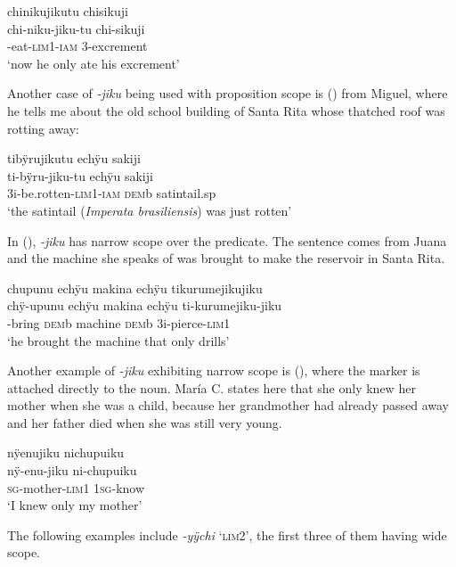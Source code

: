\ea\label{ex:jiku-1}
\begingl
\glpreamble chinikujikutu chisikuji\\
\gla chi-niku-jiku-tu chi-sikuji\\
-eat-\textsc{lim}1-\textsc{iam} 3-excrement\\
\glft ‘now he only ate his excrement’
\endgl
\trailingcitation{[jmx-n120429ls-x5.213]}
\xe

Another case of \textit{-jiku} being used with proposition scope is () from Miguel, where he tells me about the old school building of Santa Rita whose thatched roof was rotting away:

\ea\label{ex:jiku-4}
\begingl
\glpreamble tibÿrujikutu echÿu sakiji\\
\gla ti-bÿru-jiku-tu echÿu sakiji\\
\glb 3i-be.rotten-\textsc{lim}1-\textsc{iam} \textsc{dem}b satintail.sp\\
\glft ‘the satintail (\textit{Imperata brasiliensis}) was just rotten’
\endgl
\trailingcitation{[mxx-p110825l.090]}
\xe

In (), \textit{-jiku} has narrow scope over the predicate. The sentence comes from Juana and the machine she speaks of was brought to make the reservoir in Santa Rita.

\ea\label{ex:jiku-3}
\begingl
\glpreamble chupunu echÿu makina echÿu tikurumejikujiku\\
\gla chÿ-upunu echÿu makina echÿu ti-kurumejiku-jiku\\
-bring \textsc{dem}b machine \textsc{dem}b 3i-pierce-\textsc{lim}1\\
\glft ‘he brought the machine that only drills’
\endgl
\trailingcitation{[jxx-p120515l-2.215]}
\xe

Another example of \textit{-jiku} exhibiting narrow scope is (), where the marker is attached directly to the noun. María C. states here that she only knew her mother when she was a child, because her grandmother had already passed away and her father died when she was still very young.

\ea\label{ex:jiku-5}
\begingl
\glpreamble nÿenujiku nichupuiku\\
\gla nÿ-enu-jiku ni-chupuiku\\
\textsc{sg}-mother-\textsc{lim}1 1\textsc{sg}-know\\
\glft ‘I knew only my mother'
\endgl
\trailingcitation{[ump-p110815sf.147]}
\xe

The following examples include \textit{-yÿchi} ‘\textsc{lim}2’, the first three of them having wide scope.

